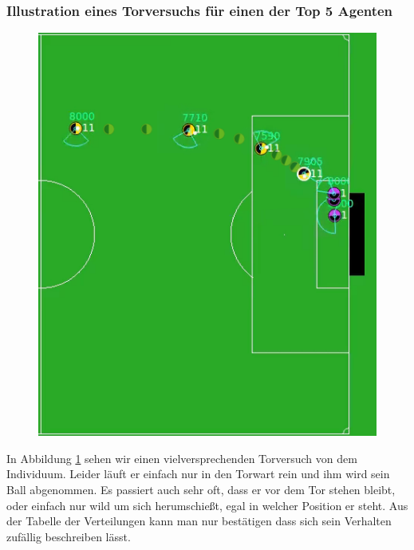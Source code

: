 \newpage
        \subsubsection*{Illustration eines Torversuchs für einen der Top 5 Agenten}
        \begin{figure}[H]
            \begin{center}
                \includegraphics[scale=0.83]{../pictures/games/actiondist-gameplay.png}\\
                \caption{\label{fig:actiondist-gameplay}}
            \end{center}
        \end{figure}

        In Abbildung \ref{fig:actiondist-gameplay} sehen wir einen vielversprechenden Torversuch von dem Individuum. Leider läuft er einfach nur in den Torwart rein und ihm wird sein Ball abgenommen. Es passiert auch sehr oft, dass er vor dem Tor stehen bleibt, oder einfach nur wild um sich herumschießt, egal in welcher Position er steht. Aus der Tabelle der Verteilungen kann man nur bestätigen dass sich sein Verhalten zufällig beschreiben lässt.


\newpage
